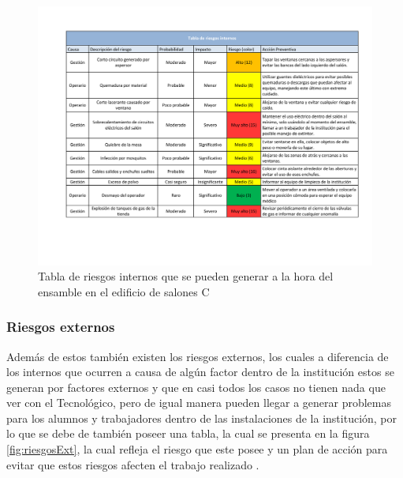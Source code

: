     \begin{figure}[H]
        \centering
        \includegraphics[trim = {20mm 15mm 10mm 20mm},clip,scale=0.35]{19/Img/riesgosInt.pdf}
        \caption{Tabla de riesgos internos que se pueden generar a la hora del ensamble en el edificio de salones C}
        \label{fig:riesgosInt}
    \end{figure}
    
    \newpage
    \subsubsection{Riesgos externos}

     Además de estos también existen los riesgos externos, los cuales a diferencia de los internos que ocurren a causa de algún factor dentro de la institución estos se generan por factores externos y que en casi todos los casos no tienen nada que ver con el Tecnológico, pero de igual manera pueden llegar a generar problemas para los alumnos y trabajadores dentro de las instalaciones de la institución, por lo que se debe de también poseer una tabla, la cual se presenta en la figura \ref{fig:riesgosExt}, la cual refleja el riesgo que este posee y un plan de acción para evitar que estos riesgos afecten el trabajo realizado .

